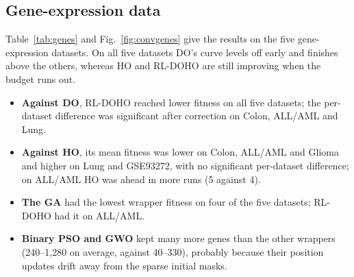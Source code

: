 \documentclass[pdflatex,sn-basic]{sn-jnl}
\begin{document}
\subsection{Gene-expression data}
Table~\ref{tab:genes} and Fig.~\ref{fig:convgenes} give the results on the five gene-expression datasets. On all five datasets DO's curve levels off early and finishes above the others, whereas HO and RL-DOHO are still improving when the budget runs out.
\begin{itemize}
\item \textbf{Against DO}, RL-DOHO reached lower fitness on all five datasets; the per-dataset difference was significant after correction on Colon, ALL/AML and Lung.
\item \textbf{Against HO}, its mean fitness was lower on Colon, ALL/AML and Glioma and higher on Lung and GSE93272, with no significant per-dataset difference; on ALL/AML HO was ahead in more runs (5 against 4).
\item \textbf{The GA} had the lowest wrapper fitness on four of the five datasets; RL-DOHO had it on ALL/AML.
\item \textbf{Binary PSO and GWO} kept many more genes than the other wrappers (240--1,280 on average, against 40--330), probably because their position updates drift away from the sparse initial masks.
\end{itemize}
\end{document}
